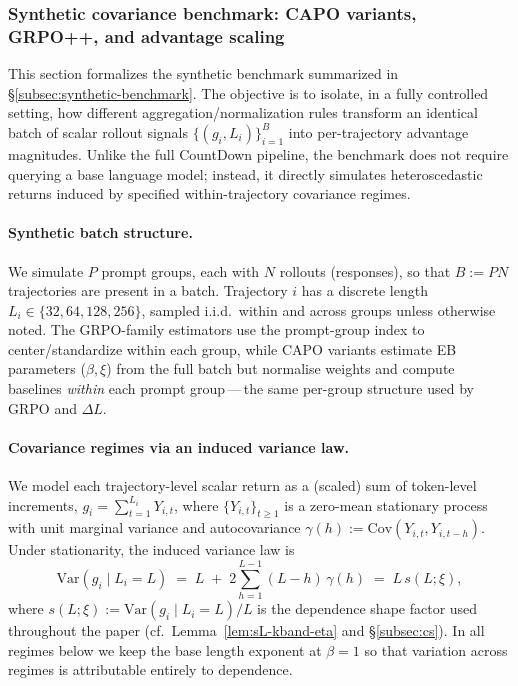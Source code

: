 \subsubsection{Synthetic covariance benchmark: CAPO variants, GRPO++, and advantage scaling}
\label{sec:synthetic-covariance-benchmark}

This section formalizes the synthetic benchmark summarized in \S\ref{subsec:synthetic-benchmark}.
The objective is to isolate, in a fully controlled setting, how different aggregation/normalization rules transform an identical batch of scalar rollout signals \(\{(g_i,L_i)\}_{i=1}^{B}\) into per-trajectory advantage magnitudes.
Unlike the full CountDown pipeline, the benchmark does not require querying a base language model; instead, it directly simulates heteroscedastic returns induced by specified within-trajectory covariance regimes.

\paragraph{Synthetic batch structure.}
We simulate \(P\) prompt groups, each with \(N\) rollouts (responses), so that \(B:=PN\) trajectories are present in a batch.
Trajectory \(i\) has a discrete length \(L_i\in\{32,64,128,256\}\), sampled i.i.d.\ within and across groups unless otherwise noted.
The GRPO-family estimators use the prompt-group index to center/standardize within each group, while CAPO variants estimate EB parameters (\(\beta,\xi\)) from the full batch but normalise weights and compute baselines \emph{within} each prompt group\,---\,the same per-group structure used by GRPO and \(\Delta L\).

\paragraph{Covariance regimes via an induced variance law.}
We model each trajectory-level scalar return as a (scaled) sum of token-level increments,
\(g_i=\sum_{t=1}^{L_i} Y_{i,t}\),
where \(\{Y_{i,t}\}_{t\ge 1}\) is a zero-mean stationary process with unit marginal variance and autocovariance \(\gamma(h):=\mathrm{Cov}(Y_{i,t},Y_{i,t-h})\).
Under stationarity, the induced variance law is
\begin{equation}
  \mathrm{Var}(g_i\mid L_i=L)
  \;=\;
  L \;+\; 2\sum_{h=1}^{L-1} (L-h)\,\gamma(h)
  \;=\;
  L\,s(L;\xi),
  \label{eq:synth_vL_general}
\end{equation}
where \(s(L;\xi):=\mathrm{Var}(g_i\mid L_i=L)/L\) is the dependence shape factor used throughout the paper (cf.\ Lemma~\ref{lem:sL-kband-eta} and \S\ref{subsec:cs}).
In all regimes below we keep the base length exponent at \(\beta=1\) so that variation across regimes is attributable entirely to dependence.

